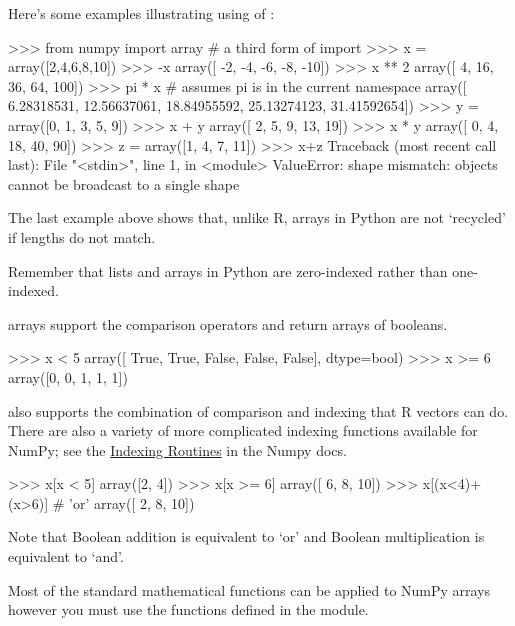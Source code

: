Here's some examples illustrating using of \numpy:
\begin{python}
>>> from numpy import array # a third form of import 
>>> x = array([2,4,6,8,10])
>>> -x
array([ -2,  -4,  -6,  -8, -10])
>>> x ** 2
array([  4,  16,  36,  64, 100])
>>> pi * x # assumes pi is in the current namespace
array([  6.28318531,  12.56637061,  18.84955592,  25.13274123,  31.41592654])
>>> y = array([0, 1, 3, 5, 9])
>>> x + y
array([ 2,  5,  9, 13, 19])
>>> x * y
array([ 0,  4, 18, 40, 90])
>>> z = array([1, 4, 7, 11])
>>> x+z
Traceback (most recent call last):
  File "<stdin>", line 1, in <module>
ValueError: shape mismatch: objects cannot be broadcast to a single shape
\end{python}
%
The last example above shows that, unlike R, \numpy arrays in Python are
not `recycled' if lengths do not match.

Remember that lists and arrays in Python are zero-indexed rather than
one-indexed.
%

\numpy arrays support the comparison operators and return arrays of
booleans.
\begin{python}
    >>> x < 5 
    array([ True, True, False, False, False], dtype=bool)
    >>> x >= 6 
    array([0, 0, 1, 1, 1])
\end{python}
%
\numpy also supports the combination of comparison and indexing that R vectors
can do. There are also a variety of more complicated indexing functions
available for NumPy; see the
\href{http://docs.scipy.org/doc/numpy/reference/routines.indexing.html}{Indexing Routines} in the Numpy docs.
%
\begin{python}
>>> x[x < 5]
array([2, 4])
>>> x[x >= 6]
array([ 6,  8, 10])
>>> x[(x<4)+(x>6)]  # 'or'
array([ 2,  8, 10])
\end{python}
%
Note that Boolean addition is equivalent to `or' and Boolean
multiplication is equivalent to `and'.

Most of the standard mathematical functions can be applied to NumPy
arrays however you must use the functions defined in the
\numpy module.
%


